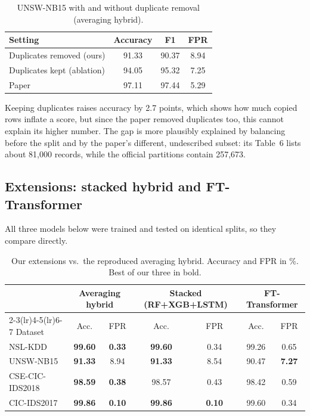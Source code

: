 \documentclass[11pt,a4paper]{article}
\newcommand{\best}[1]{\textbf{#1}}
\begin{document}
\begin{table}[H]
\centering
\caption{UNSW-NB15 with and without duplicate removal (averaging hybrid).}
\label{tab:unsw}
\small
\begin{tabular}{lccc}
\toprule
Setting & Accuracy & F1 & FPR \\
\midrule
Duplicates removed (ours)  & 91.33 & 90.37 & 8.94 \\
Duplicates kept (ablation) & 94.05 & 95.32 & 7.25 \\
Paper                      & 97.11 & 97.44 & 5.29 \\
\bottomrule
\end{tabular}
\end{table}

Keeping duplicates raises accuracy by 2.7 points, which shows how much copied rows inflate a score, but since the
paper removed duplicates too, this cannot explain its higher number. The gap is more plausibly explained by
balancing before the split and by the paper's different, undescribed subset: its Table~6 lists about 81{,}000 records, while the official
partitions contain 257{,}673.

\subsection{Extensions: stacked hybrid and FT-Transformer}
All three models below were trained and tested on identical splits, so they compare directly.

\begin{table}[H]
\centering
\caption{Our extensions vs.\ the reproduced averaging hybrid. Accuracy and FPR in \%. Best of our three in bold.}
\label{tab:novel}
\small
\begin{tabular}{lcccccc}
\toprule
& \multicolumn{2}{c}{Averaging hybrid} & \multicolumn{2}{c}{Stacked (RF+XGB+LSTM)} & \multicolumn{2}{c}{FT-Transformer} \\
\cmidrule(lr){2-3}\cmidrule(lr){4-5}\cmidrule(lr){6-7}
Dataset & Acc. & FPR & Acc. & FPR & Acc. & FPR \\
\midrule
NSL-KDD         & \best{99.60} & \best{0.33} & \best{99.60} & 0.34 & 99.26 & 0.65 \\
UNSW-NB15       & \best{91.33} & 8.94 & \best{91.33} & 8.54 & 90.47 & \best{7.27} \\
CSE-CIC-IDS2018 & \best{98.59} & \best{0.38} & 98.57 & 0.43 & 98.42 & 0.59 \\
CIC-IDS2017     & \best{99.86} & \best{0.10} & \best{99.86} & \best{0.10} & 99.60 & 0.34 \\
\bottomrule
\end{tabular}
\end{table}
\end{document}
